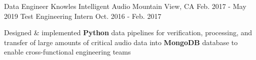 \begin{cventries}
\cventryupdate
    {Data Engineer} %
    {Knowles Intelligent Audio} %
    {Mountain View, CA} %
    {Feb. 2017 - May 2019} %
    {Test Engineering Intern} %
    {Oct. 2016 - Feb. 2017} %
    {
      \begin{cvitems} %
 		\item {Designed \& implemented \textbf{Python} data pipelines for verification, processing, and transfer of large amounts of critical audio data into \textbf{MongoDB} database to enable cross-functional engineering teams}
      \end{cvitems}
    }

\end{cventries}
